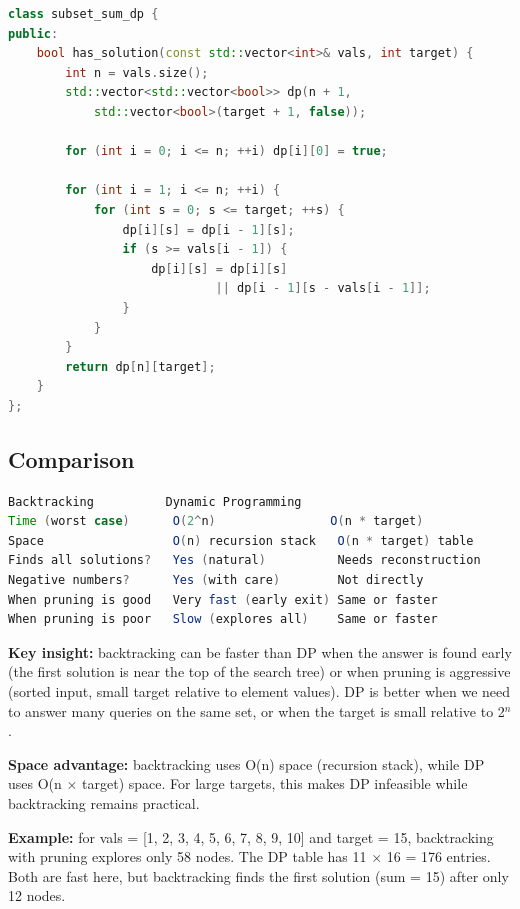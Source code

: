 \begin{lstlisting}[language=C++]
class subset_sum_dp {
public:
    bool has_solution(const std::vector<int>& vals, int target) {
        int n = vals.size();
        std::vector<std::vector<bool>> dp(n + 1,
            std::vector<bool>(target + 1, false));

        for (int i = 0; i <= n; ++i) dp[i][0] = true;

        for (int i = 1; i <= n; ++i) {
            for (int s = 0; s <= target; ++s) {
                dp[i][s] = dp[i - 1][s];
                if (s >= vals[i - 1]) {
                    dp[i][s] = dp[i][s]
                             || dp[i - 1][s - vals[i - 1]];
                }
            }
        }
        return dp[n][target];
    }
};
\end{lstlisting}

\subsection{Comparison}

\begin{lstlisting}[language=Java]
                        Backtracking          Dynamic Programming
Time (worst case)      O(2^n)                O(n * target)
Space                  O(n) recursion stack   O(n * target) table
Finds all solutions?   Yes (natural)          Needs reconstruction
Negative numbers?      Yes (with care)        Not directly
When pruning is good   Very fast (early exit) Same or faster
When pruning is poor   Slow (explores all)    Same or faster
\end{lstlisting}

\textbf{Key insight:} backtracking can be faster than DP when the answer is found early (the first solution is near the top of the search tree) or when pruning is aggressive (sorted input, small target relative to element values). DP is better when we need to answer many queries on the same set, or when the target is small relative to 2$^{n}$.

\textbf{Space advantage:} backtracking uses O(n) space (recursion stack), while DP uses O(n $\times$ target) space. For large targets, this makes DP infeasible while backtracking remains practical.

\textbf{Example:} for vals = [1, 2, 3, 4, 5, 6, 7, 8, 9, 10] and target = 15, backtracking with pruning explores only 58 nodes. The DP table has 11 $\times$ 16 = 176 entries. Both are fast here, but backtracking finds the first solution (sum = 15) after only 12 nodes.


